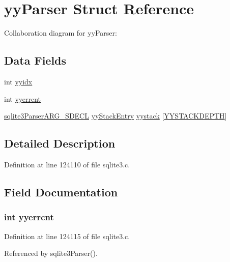 \hypertarget{structyy_parser}{}\section{yy\+Parser Struct Reference}
\label{structyy_parser}


Collaboration diagram for yy\+Parser\+:
\subsection*{Data Fields}
\begin{DoxyCompactItemize}
\item 
int \hyperlink{structyy_parser_aa2a03c2f11e7c7623c34ea15f4dcf792}{yyidx}
\item 
int \hyperlink{structyy_parser_a1ca8dbcc28d2254fbab94c873aba1598}{yyerrcnt}
\item 
\hyperlink{sqlite3_8c_a0053738165ec9f0c84cd1ed2a1d96eaa}{sqlite3\+Parser\+A\+R\+G\+\_\+\+S\+D\+E\+C\+L} \hyperlink{structyy_stack_entry}{yy\+Stack\+Entry} \hyperlink{structyy_parser_a36a200ba103b374705d58ec9de30632e}{yystack} \mbox{[}\hyperlink{sqlite3_8c_ad059052e5b8828cc7d19b4c8494ecb07}{Y\+Y\+S\+T\+A\+C\+K\+D\+E\+P\+T\+H}\mbox{]}
\end{DoxyCompactItemize}


\subsection{Detailed Description}


Definition at line 124110 of file sqlite3.\+c.



\subsection{Field Documentation}
\hypertarget{structyy_parser_a1ca8dbcc28d2254fbab94c873aba1598}{}
\subsubsection[{yyerrcnt}]{\setlength{\rightskip}{0pt plus 5cm}int yyerrcnt}\label{structyy_parser_a1ca8dbcc28d2254fbab94c873aba1598}


Definition at line 124115 of file sqlite3.\+c.



Referenced by sqlite3\+Parser().

